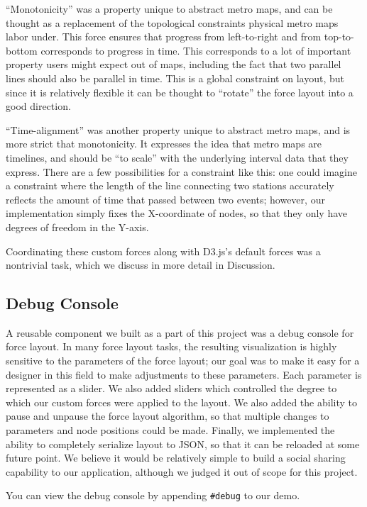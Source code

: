 \documentclass{chi2009}
\begin{document}
``Monotonicity'' was a property unique to abstract metro maps, and can
be thought as a replacement of the topological constraints physical
metro maps labor under.  This force ensures that progress from
left-to-right and from top-to-bottom corresponds to progress in time.
This corresponds to a lot of important property users might expect out
of maps, including the fact that two parallel lines should also be parallel
in time.  This is a global constraint on layout, but since it is relatively
flexible it can be thought to ``rotate'' the force layout into a good direction.

``Time-alignment'' was another property unique to abstract metro maps,
and is more strict that monotonicity.  It expresses the idea that metro maps
are timelines, and should be ``to scale'' with the underlying interval data
that they express.  There are a few possibilities for a constraint like this:
one could imagine a constraint where the length of the line connecting two
stations accurately reflects the amount of time that passed between two events;
however, our implementation simply fixes the X-coordinate of nodes, so that
they only have degrees of freedom in the Y-axis.

Coordinating these custom forces along with D3.js's default forces was a nontrivial
task, which we discuss in more detail in Discussion.

\subsection{Debug Console}

A reusable component we built as a part of this project was a debug
console for force layout.  In many force layout tasks, the resulting
visualization is highly sensitive to the parameters of the force layout;
our goal was to make it easy for a designer in this field to make
adjustments to these parameters.  Each parameter is represented as a
slider.  We also added sliders which controlled the degree to which our
custom forces were applied to the layout.  We also added the ability to
pause and unpause the force layout algorithm, so that multiple changes
to parameters and node positions could be made.  Finally, we implemented
the ability to completely serialize layout to JSON, so that it can be
reloaded at some future point.  We believe it would be relatively simple
to build a social sharing capability to our application, although we
judged it out of scope for this project.

You can view the debug console by appending \verb|#debug| to our demo.
\end{document}
